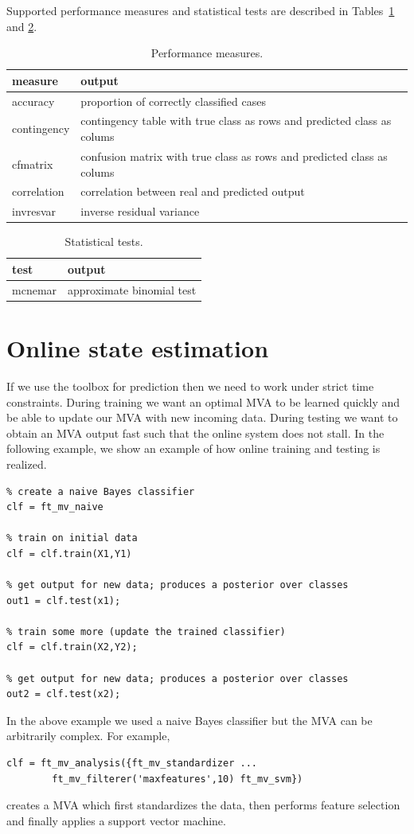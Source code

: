 \documentclass{article}
\begin{document}
Supported performance measures and statistical tests are described in Tables~\ref{tab:measure} and \ref{tab:test}.
\begin{table}[ht]
\centering
\caption{Performance measures.}
\begin{tabular}{p{}|p{}}
{\bf measure} & {\bf output}\\
\hline
accuracy &proportion of correctly classified cases\\
contingency & contingency table with true class as rows and predicted class as colums\\
cfmatrix & confusion matrix with true class as rows and predicted class as colums\\
correlation & correlation between real and predicted output\\
invresvar & inverse residual variance
\end{tabular}
\label{tab:measure}
\end{table}

\begin{table}[ht]
\centering
\caption{Statistical tests.}
\begin{tabular}{p{}|p{}}
{\bf test} & {\bf output}\\
\hline
mcnemar & approximate binomial test
\end{tabular}
\label{tab:test}
\end{table}

\newpage

\section{Online state estimation}

If we use the toolbox for prediction then we need to work under strict time constraints. During training we want an optimal MVA to be learned quickly and be able to update our MVA with new incoming data. During testing we want to obtain an MVA output fast such that the online system does not stall. In the following example, we show an example of how online training and testing is realized.
\begin{verbatim}
% create a naive Bayes classifier
clf = ft_mv_naive

% train on initial data
clf = clf.train(X1,Y1)

% get output for new data; produces a posterior over classes
out1 = clf.test(x1);

% train some more (update the trained classifier)
clf = clf.train(X2,Y2);

% get output for new data; produces a posterior over classes
out2 = clf.test(x2);
\end{verbatim}
In the above example we used a naive Bayes classifier but the MVA can be arbitrarily complex. For example, 
\begin{verbatim}
clf = ft_mv_analysis({ft_mv_standardizer ...
        ft_mv_filterer('maxfeatures',10) ft_mv_svm})
\end{verbatim}
creates a MVA which first standardizes the data, then performs feature selection and finally applies a support vector machine.
\end{document}
